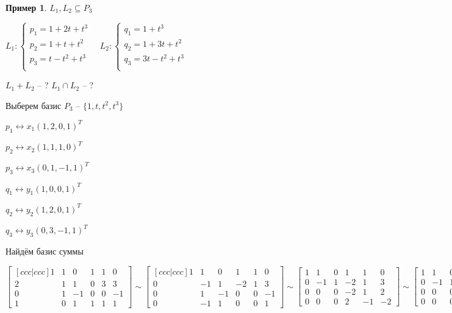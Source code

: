 \documentclass{book}
\theoremstyle{definition}
\newtheorem*{example}{Пример}
\begin{document}
    \begin{example}
        $L_1, L_2 \subseteq P_3$

        $L_1: \begin{cases}
            p_1 = 1+2t+t^3\\
            p_2 = 1+t+t^2\\
            p_3 = t-t^2+t^3\\
        \end{cases}\quad L_2: \begin{cases}
            q_1 = 1+t^3\\
            q_2 = 1+3t+t^2\\
            q_3 = 3t-t^2+t^3\\
        \end{cases}$ 

        $L_1+L_2$ -- ? $L_1\cap L_2$ -- ?

        Выберем базис  $P_3$ --  $\{1, t, t^2, t^3\}$

        $p_1 \longleftrightarrow x_1(1, 2, 0, 1)^T$

        $p_2 \longleftrightarrow x_2(1, 1, 1, 0)^T$
        
        $p_3 \longleftrightarrow x_3(0, 1, -1, 1)^T$
        
        $q_1 \longleftrightarrow y_1(1, 0, 0, 1)^T$
        
        $q_2 \longleftrightarrow y_2(1, 2, 0, 1)^T$
        
        $q_3 \longleftrightarrow y_3(0,3,-1,1)^T$


        Найдём базис суммы

        $\begin{bmatrix} [c c c| c c c] 
        1&1&0&1&1&0\\
        2&1&1&0&3&3\\
        0&1&-1&0&0&-1\\
        1&0&1&1&1&1  
        \end{bmatrix} 
        \sim 
        \begin{bmatrix} [c c c|c c c] 
        1&1&0&1&1&0\\
        0&-1&1&-2&1&3\\
        0&1&-1&0&0&-1\\
        0&-1&1&0&0&1 
        \end{bmatrix} 
        \sim 
        \begin{bmatrix} 
        1&1&0&1&1&0\\
        0&-1&1&-2&1&3\\
        0&0&0&-2&1&2\\
        0&0&0&2&-1&-2 
        \end{bmatrix} 
        \sim 
        \begin{bmatrix} 
        1&1&0&1&1&0\\0&-1&1&-2&1&3\\0&0&0&-2&1&2\\0&0&0&0&0&0 \end{bmatrix} $


\end{example}
\end{document}
